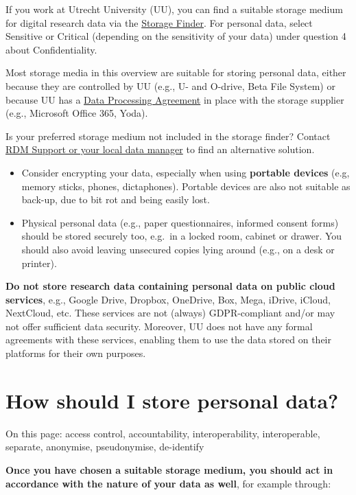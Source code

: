 \documentclass[
]{book}
\providecommand{\tightlist}{%
  \setlength{\itemsep}{0pt}\setlength{\parskip}{0pt}}
\begin{document}
If you work at Utrecht University (UU), you can find a suitable storage medium for
digital research data via the
\href{https://tools.uu.nl/storagefinder/}{Storage Finder}. For
personal data, select Sensitive or Critical (depending on the sensitivity of
your data) under question 4 about Confidentiality.

Most storage media in this overview are suitable for storing personal data, either
because they are controlled by UU (e.g., U- and O-drive, Beta File System) or
because UU has a \protect\hyperlink{data-processing-agreement}{Data Processing Agreement} in
place with the storage supplier (e.g., Microsoft Office 365, Yoda).

Is your preferred storage medium not included in the storage finder? Contact
\protect\hyperlink{support}{RDM Support or your local data manager} to find an alternative solution.

\begin{itemize}
\tightlist
\item
  Consider encrypting your data, especially when using \textbf{portable devices}
  (e.g, memory sticks, phones, dictaphones). Portable devices are also not suitable as back-up,
  due to bit rot and being easily lost.
\item
  Physical personal data (e.g., paper questionnaires, informed consent forms)
  should be stored securely too, e.g.~in a locked room, cabinet or drawer. You
  should also avoid leaving unsecured copies lying around (e.g., on a desk or printer).
\end{itemize}

\textbf{Do not store research data containing personal data on public cloud services},
e.g., Google Drive, Dropbox, OneDrive, Box, Mega, iDrive, iCloud, NextCloud, etc.
These services are not (always) GDPR-compliant and/or may not offer sufficient
data security. Moreover, UU does not have any formal agreements with these
services, enabling them to use the data stored on their platforms for their own
purposes.

\hypertarget{data-storage-how}{%
\section{How should I store personal data?}\label{data-storage-how}}

On this page: access control, accountability, interoperability, interoperable,
separate, anonymise, pseudonymise, de-identify

\textbf{Once you have chosen a suitable storage medium, you should act in accordance
with the nature of your data as well}, for example through:
\end{document}
